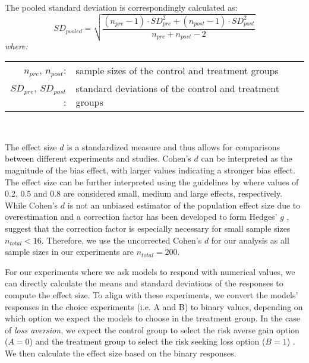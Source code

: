 \par The pooled standard deviation is correspondingly calculated as:
\begin{equation} \label{eq:cohensd_sd}
  SD_{pooled} = \sqrt{\frac{(n_{pre} - 1) \cdot SD_{pre}^2 + (n_{post} - 1) \cdot SD_{post}^2}{n_{pre} + n_{post} - 2}}
\end{equation}
\hspace{0.5cm} \textit{where:} \\
\hspace*{3em}
\begin{tabular}{rl}
    $n_{pre}$, $n_{post}$:& sample sizes of the control and treatment groups \\
    $SD_{pre}$, $SD_{post}$:& standard deviations of the control and treatment groups
\end{tabular} \\

\par The effect size $d$ is a standardized measure and thus allows for comparisons between different experiments and studies. Cohen's $d$ can be interpreted as the magnitude of the bias effect, with larger values indicating a stronger bias effect. The effect size can be further interpreted using the guidelines by \textcite{cohen1988statistical} where values of 0.2, 0.5 and 0.8 are considered small, medium and large effects, respectively. While Cohen's $d$ is not an unbiased estimator of the population effect size due to overestimation and a correction factor has been developed to form Hedges' $g$ \parencite{hedges1981distribution}, \textcite{goulet2018review} suggest that the correction factor is especially necessary for small sample sizes $n_{total} < 16$. Therefore, we use the uncorrected Cohen's $d$ for our analysis as all sample sizes in our experiments are $n_{total} = 200$.

\par For our experiments where we ask models to respond with numerical values, we can directly calculate the means and standard deviations of the responses to compute the effect size. To align with these experiments, we convert the models' responses in the choice experiments (i.e. A and B) to binary values, depending on which option we expect the models to choose in the treatment group. In the case of \textit{loss aversion}, we expect the control group to select the risk averse gain option ($A=0$) and the treatment group to select the risk seeking loss option ($B=1$) \parencite{thaler2015misbehaving}. We then calculate the effect size based on the binary responses.

